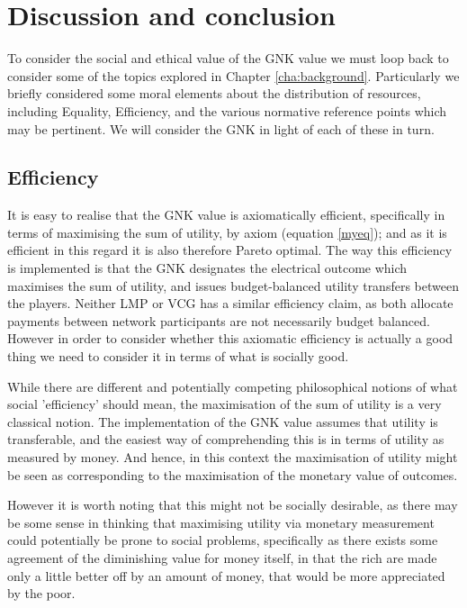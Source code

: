 \section{Discussion and conclusion}\label{sec:GNK_value_discussion}

To consider the social and ethical value of the GNK value we must loop back to consider some of the topics explored in Chapter \ref{cha:background}.
Particularly we briefly considered some moral elements about the distribution of resources, including Equality, Efficiency, and the various normative reference points which may be pertinent.
We will consider the GNK in light of each of these in turn.

\subsection{Efficiency}
It is easy to realise that the GNK value is axiomatically efficient, specifically in terms of maximising the sum of utility, by axiom (equation \ref{myeq}); and as it is efficient in this regard it is also therefore Pareto optimal.
The way this efficiency is implemented is that the GNK designates the electrical outcome which maximises the sum of utility, and issues budget-balanced utility transfers between the players.
Neither LMP or VCG has a similar efficiency claim, as both allocate payments between network participants are not necessarily budget balanced.
However in order to consider whether this axiomatic efficiency is actually a good thing we need to consider it in terms of what is socially good.

While there are different and potentially competing philosophical notions of what social 'efficiency' should mean, the maximisation of the sum of utility is a very classical notion.
The implementation of the GNK value assumes that utility is transferable, and the easiest way of comprehending this is in terms of utility as measured by money. And hence, in this context the maximisation of utility might be seen as corresponding to the maximisation of the monetary value of outcomes.

However it is worth noting that this might not be socially desirable, as there may be some sense in thinking that maximising utility via monetary measurement could potentially be prone to social problems, specifically as there exists some agreement of the diminishing value for money itself, in that the rich are made only a little better off by an amount of money, that would be more appreciated by the poor.

